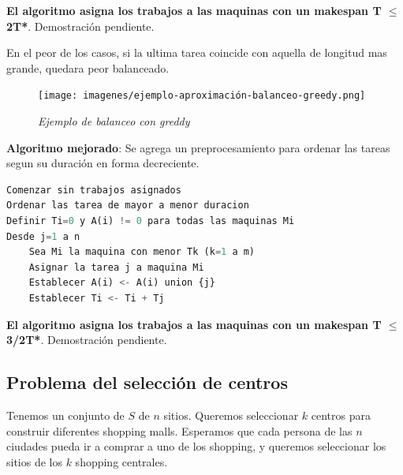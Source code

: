 \documentclass{article}
\begin{document}
\textbf{El algoritmo asigna los trabajos a las maquinas con un makespan T \(\leq\) 2T*}. Demostración pendiente.

En el peor de los casos, si la ultima tarea coincide con aquella de longitud mas grande, quedara
peor balanceado.

\begin{figure}[h!]
    \begin{center} 
    \texttt{[image: imagenes/ejemplo-aproximación-balanceo-greedy.png]}
    \caption{\small \sl Ejemplo de balanceo con greddy} 
    \end{center}
\end{figure}

\textbf{Algoritmo mejorado}: Se agrega un preprocesamiento para ordenar las tareas segun su duración 
en forma decreciente.

\begin{lstlisting}[language=Python, caption=Algoritmo de aproximación greedy mejorado]
Comenzar sin trabajos asignados
Ordenar las tarea de mayor a menor duracion
Definir Ti=0 y A(i) != 0 para todas las maquinas Mi
Desde j=1 a n
    Sea Mi la maquina con menor Tk (k=1 a m)
    Asignar la tarea j a maquina Mi
    Establecer A(i) <- A(i) union {j}
    Establecer Ti <- Ti + Tj

\end{lstlisting}    

\textbf{El algoritmo asigna los trabajos a las maquinas con un makespan T \(\leq\) 3/2T*}. Demostración pendiente.



\newpage
\subsection{Problema del selección de centros}

Tenemos un conjunto de \(S\) de \(n\) sitios. Queremos seleccionar \(k\) centros para construir 
diferentes shopping malls. Esperamos que cada persona de las \(n\) ciudades pueda ir a comprar a 
uno de los shopping, y queremos seleccionar los sitios de los \(k\) shopping centrales.
\end{document}
